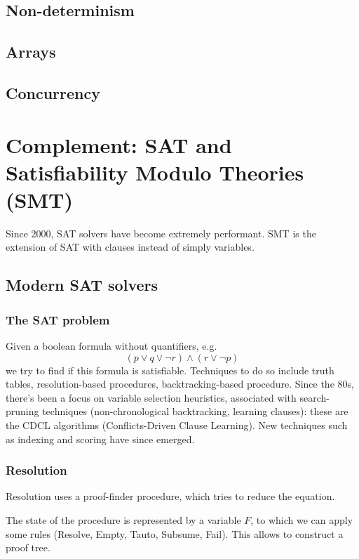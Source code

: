 \documentclass[toc]{../cs-classes/cs-classes}
\begin{document}
\subsection{Non-determinism}

\subsection{Arrays}

\subsection{Concurrency}







\newpage
\section{Complement: SAT and Satisfiability Modulo Theories (SMT)}
Since 2000, SAT solvers have become extremely performant. SMT is the extension of SAT with clauses instead of simply variables.
\subsection{Modern SAT solvers}
\subsubsection{The SAT problem}
Given a boolean formula without quantifiers, e.g.
\begin{equation*}
    (p\lor q\lor \lnot r)\land(r\lor \lnot p)
\end{equation*}
we try to find if this formula is satisfiable. Techniques to do so include truth tables, resolution-based procedures, backtracking-based procedure. Since the 80s, there's been a focus on variable selection heuristics, associated with search-pruning techniques (non-chronological backtracking, learning clauses): these are the CDCL algorithms (Conflicts-Driven Clause Learning). New techniques such as indexing and scoring have since emerged.

\subsubsection{Resolution}
Resolution uses a proof-finder procedure, which tries to reduce the equation.

The state of the procedure is represented by a variable $F$, to which we can apply some rules (Resolve, Empty, Tauto, Subsume, Fail). This allows to construct a proof tree.
\end{document}

